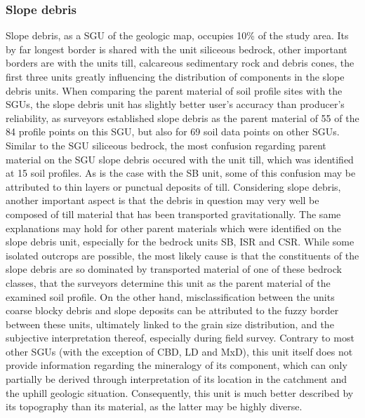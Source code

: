 \documentclass[preprint,12pt,authoryear]{elsarticle}
\begin{document}
\subsubsection{Slope debris}
\label{section:results_SD}
Slope debris, as a SGU of the geologic map, occupies 10\% of the study area. Its by far longest border is shared with the unit siliceous bedrock, other important borders are with the units till, calcareous sedimentary rock and debris cones, the first three units greatly influencing the distribution of components in the slope debris units. When comparing the parent material of soil profile sites with the SGUs, the slope debris unit has slightly better user's accuracy than producer's reliability, as surveyors established slope debris as the parent material of 55 of the 84 profile points on this SGU, but also for 69 soil data points on other SGUs. Similar to the SGU siliceous bedrock, the most confusion regarding parent material on the SGU slope debris occured with the unit till, which was identified at 15 soil profiles. As is the case with the SB unit, some of this confusion may be attributed to thin layers or punctual deposits of till. Considering slope debris, another important aspect is that the debris in question may very well be composed of till material that has been transported gravitationally. The same explanations may hold for other parent materials which were identified on the slope debris unit, especially for the bedrock units SB, ISR and  CSR. While some isolated outcrops are possible, the most likely cause is that the constituents of the slope debris are so dominated by transported material of one of these bedrock classes, that the surveyors determine this unit as the parent material of the examined soil profile. On the other hand, misclassification between the units coarse blocky debris and slope deposits can be attributed to the fuzzy border between these units, ultimately linked to the grain size distribution, and the subjective interpretation thereof, especially during field survey. 
Contrary to most other SGUs (with the exception of CBD, LD and MxD), this unit itself does not provide information regarding the mineralogy of its component, which can only partially be derived through  interpretation  of its location in the catchment and the uphill geologic situation. Consequently, this unit  is much better described by its topography than its material, as the latter may be highly diverse. 
\end{document}
